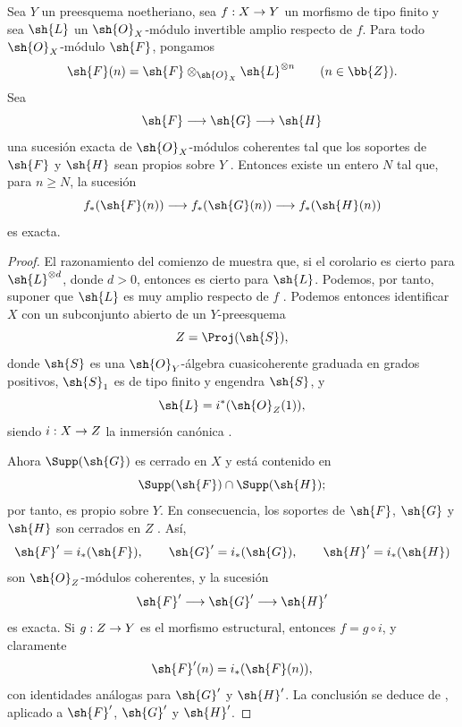 \documentclass[oneside]{amsart}
\makeatletter
\renewcommand{\geq}{\geqslant}
\newcommand{\ega@arrow}[2]{\mathchoice{#1}{#2}{#2}{#2}}
\renewcommand{\to}{\ega@arrow{\longrightarrow}{\rightarrow}}
\let\EGAOriginalLabel\label
\renewcommand{\label}[1]{\phantomsection\EGAOriginalLabel{#1}}
\makeatother
\begin{document}
\begin{corollary}[2.2.4]
\label{III.2.2.4}
Sea $Y$ un preesquema noetheriano, sea $f:X\to Y$ un morfismo de tipo finito y sea $\sh{L}$ un $\sh{O}_X$-módulo invertible amplio respecto de $f$.
Para todo $\sh{O}_X$-módulo $\sh{F}$, pongamos
\[
  \sh{F}(n)=\sh{F}\otimes_{\sh{O}_X}\sh{L}^{\otimes n}
  \qquad(n\in\bb{Z}).
\]
Sea
\[
  \sh{F}\longrightarrow\sh{G}\longrightarrow\sh{H}
\]
una sucesión exacta de $\sh{O}_X$-módulos coherentes tal que los soportes de $\sh{F}$ y $\sh{H}$ sean propios sobre $Y$ \textup{}.
Entonces existe un entero $N$ tal que, para $n\geq N$, la sucesión
\[
  f_*(\sh{F}(n))
  \longrightarrow f_*(\sh{G}(n))
  \longrightarrow f_*(\sh{H}(n))
\]
es exacta.
\end{corollary}

\begin{proof}
El razonamiento del comienzo de  muestra que, si el corolario es cierto para $\sh{L}^{\otimes d}$, donde $d>0$, entonces es cierto para $\sh{L}$.
Podemos, por tanto, suponer que $\sh{L}$ es muy amplio respecto de $f$ .
Podemos entonces identificar $X$ con un subconjunto abierto de un $Y$-preesquema
\[
  Z=\Proj(\sh{S}),
\]
donde $\sh{S}$ es una $\sh{O}_Y$-álgebra cuasicoherente graduada en grados positivos, $\sh{S}_1$ es de tipo finito y engendra $\sh{S}$, y
\[
  \sh{L}=i^*(\sh{O}_Z(1)),
\]
siendo $i:X\to Z$ la inmersión canónica .

Ahora $\Supp(\sh{G})$ es cerrado en $X$ y está contenido en
\[
  \Supp(\sh{F})\cap\Supp(\sh{H});
\]
por tanto, es propio sobre $Y$.
En consecuencia, los soportes de $\sh{F}$, $\sh{G}$ y $\sh{H}$ son cerrados en $Z$ .
Así,
\[
  \sh{F}'=i_*(\sh{F}),\qquad
  \sh{G}'=i_*(\sh{G}),\qquad
  \sh{H}'=i_*(\sh{H})
\]
son $\sh{O}_Z$-módulos coherentes, y la sucesión
\[
  \sh{F}'\longrightarrow\sh{G}'\longrightarrow\sh{H}'
\]
es exacta.
Si $g:Z\to Y$ es el morfismo estructural, entonces $f=g\circ i$, y claramente
\[
  \sh{F}'(n)=i_*(\sh{F}(n)),
\]
con identidades análogas para $\sh{G}'$ y $\sh{H}'$.
La conclusión se deduce de , aplicado a $\sh{F}'$, $\sh{G}'$ y $\sh{H}'$.
\end{proof}
\end{document}
